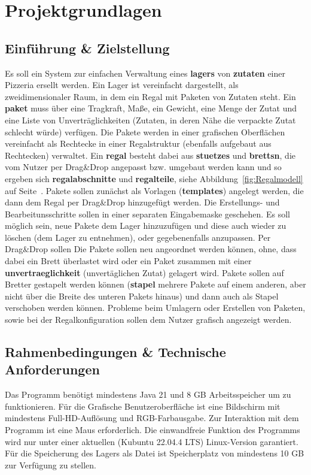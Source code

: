 \section{Projektgrundlagen}
\subsection{Einführung \& Zielstellung}
\begingroup
Es soll ein System zur einfachen Verwaltung eines \textbf{\gls{lager}s} von \textbf{\gls{zutat}en}
einer Pizzeria ersellt werden. Ein Lager ist vereinfacht dargestellt, als zweidimensionaler
Raum, in dem ein Regal mit Paketen von Zutaten steht. 
Ein \textbf{\gls{paket}} muss über eine Tragkraft, Maße, ein Gewicht, eine Menge der Zutat
und eine Liste von Unverträglichkeiten (Zutaten, in deren Nähe die verpackte Zutat schlecht würde) verfügen. 
Die Pakete werden in einer 
grafischen Oberflächen vereinfacht als Rechtecke in einer 
Regalstruktur (ebenfalls aufgebaut aus Rechtecken) verwaltet. Ein \textbf{\gls{regal}} besteht
dabei aus \textbf{\glspl{stuetze}} und \textbf{\glspl{brett}n}, die vom Nutzer per Drag\&Drop angepasst bzw. umgebaut werden kann
und so ergeben sich \textbf{\gls{regalabschnitt}e} und \textbf{\gls{regalteil}e}, siehe Abbildung~\ref{fig:Regalmodell} auf Seite~\pageref{fig:Regalmodell}.
Pakete sollen zunächst als Vorlagen (\textbf{\gls{template}s}) angelegt werden, die dann dem Regal
per Drag\&Drop hinzugefügt werden. Die Erstellungs- und Bearbeitunsschritte sollen in einer separaten Eingabemaske geschehen.
Es soll möglich sein, neue Pakete dem 
Lager hinzuzufügen und diese auch wieder zu löschen (dem Lager zu entnehmen), oder gegebenenfalls anzupassen. Per Drag\&Drop sollen 
Die Pakete sollen neu angeordnet werden können, ohne, dass dabei ein Brett überlastet wird oder
ein Paket zusammen mit einer \textbf{\gls{unvertraeglichkeit}} (unvertäglichen Zutat) gelagert wird.
Pakete sollen auf Bretter gestapelt werden können (\textbf{\gls{stapel}} mehrere Pakete auf einem anderen, aber nicht über die Breite des unteren Pakets hinaus) und dann auch als Stapel verschoben werden können. 
Probleme beim Umlagern oder Erstellen von Paketen, sowie bei der Regalkonfiguration sollen dem Nutzer grafisch angezeigt werden.
\endgroup
\subsection{Rahmenbedingungen \& Technische Anforderungen}
\begingroup 
Das Programm benötigt mindestens Java 21 und 8 GB Arbeitsspeicher um zu funktionieren. Für die 
Grafische Benutzeroberfläche ist eine Bildschirm mit mindestens Full-HD-Auflösung und
RGB-Farbausgabe. Zur Interaktion mit dem Programm ist eine Maus erforderlich. Die einwandfreie Funktion des
Programms wird nur unter einer aktuellen (Kubuntu 22.04.4 LTS) Linux-Version
garantiert. Für die Speicherung des Lagers als Datei ist Speicherplatz von mindestens
10 GB zur Verfügung zu stellen.